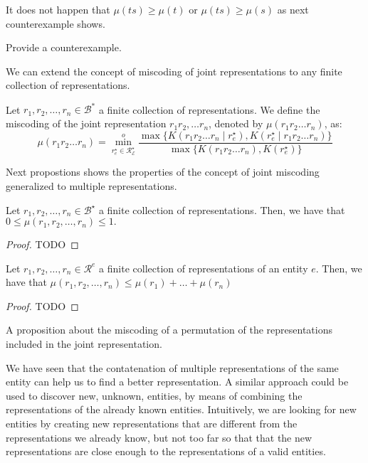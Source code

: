It does not happen that $\mu(ts) \geq \mu(t)$ or $\mu(ts) \geq \mu(s)$ as next counterexample shows.

\begin{example}
{\color{red} Provide a counterexample.}
\end{example}

We can extend the concept of miscoding of joint representations to any finite collection of representations.

\begin{definition}
Let $r_1, r_2, \ldots, r_n \in \mathcal{B}^\ast$ a finite collection of representations. We define the miscoding of the joint representation $r_1 r_2, \ldots r_n$, denoted by $\mu(r_1 r_2 \ldots r_n)$, as:
\[
\mu(r_1 r_2 \ldots r_n) = \overset{o}{ \underset{ r^\star_e \in \mathcal{R}^\star_\mathcal{E} } \min} \frac{ \max\{ K \left( r_1 r_2 \ldots r_n \mid r^\star_e \right), K \left( r^\star_e \mid r_1 r_2 \ldots r_n \right) \} } { \max\{ K \left( r_1 r_2 \ldots r_n \right), K \left( r^\star_e \right) \} }
\]
\end{definition}

Next propostions shows the properties of the concept of joint miscoding generalized to multiple representations.

\begin{proposition}
Let $r_1, r_2, \ldots, r_n \in \mathcal{B}^\star$ a finite collection of representations. Then, we have that $0 \leq \mu(r_1, r_2, \ldots, r_n) \leq 1.$
\end{proposition}
\begin{proof}
{\color{red} TODO}
\end{proof}

\begin{proposition}
Let $r_1, r_2, \ldots, r_n \in \mathcal{R}^e$ a finite collection of representations of an entity $e$. Then, we have that $\mu(r_1, r_2, \ldots, r_n) \leq \mu(r_1) + \ldots + \mu(r_n)$
\end{proposition}
\begin{proof}
{\color{red} TODO}
\end{proof}

{\color{red} A proposition about the miscoding of a permutation of the representations included in the joint representation.}

We have seen that the contatenation of multiple representations of the same entity can help us to find a better representation. A similar approach could be used to discover new, unknown, entities, by means of combining the representations of the already known entities. Intuitively, we are looking for new entities by creating new representations that are different from the representations we already know, but not too far so that that the new representations are close enough to the representations of a valid entities.

